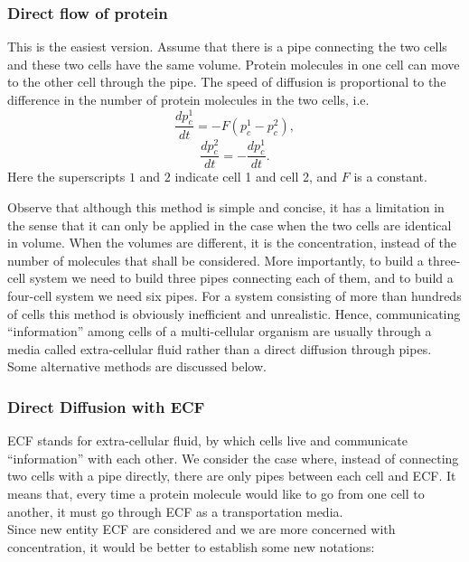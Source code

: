 \documentclass[12pt]{article}
\renewcommand{\(}{\left (}
\renewcommand{\)}{\right )}
\begin{document}
\subsubsection{Direct flow of protein}
\hspace{5mm} This is the easiest version. Assume that there is a pipe connecting the two cells and these two cells have the same volume. Protein molecules in one cell can move to the other cell through the pipe. The speed of diffusion is proportional to the difference in the number of protein molecules in the two cells, i.e.
\begin{equation}
	\frac{d {p_c^1}}{dt} = -F ({p_c^1 - p_c^2}),
\end{equation}
\begin{equation}
	\frac{d {p_c^2}}{dt} = -\frac{d {p_c^1}}{dt}.
\end{equation}
Here the superscripts $1$ and $2$ indicate cell 1 and cell 2, and $F$ is a constant.

Observe that although this method is simple and concise, it has a limitation in the sense that it can only be applied in the case when the two cells are identical in volume. When the volumes are different, it is the concentration, instead of the number of molecules that shall be considered. More importantly, to build a three-cell system we need to build three pipes connecting each of them, and to build a four-cell system we need six pipes. For a system consisting of more than hundreds of cells this method is obviously inefficient and unrealistic. Hence, communicating ``information'' among cells of a multi-cellular organism are usually through a media called extra-cellular fluid rather than a direct diffusion through pipes. Some alternative methods are discussed below.

\subsubsection{Direct Diffusion with ECF}
\hspace{5mm} ECF stands for extra-cellular fluid, by which cells live and communicate ``information'' with each other. We consider the case where, instead of connecting two cells with a pipe directly, there are only pipes between each cell and ECF. It means that, every time a protein molecule would like to go from one cell to another, it must go through ECF as a transportation media. \\

Since new entity ECF are considered and we are more concerned with concentration, it would be better to establish some new notations: \\
\end{document}
